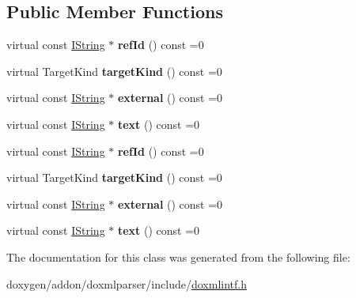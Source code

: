 \subsection*{Public Member Functions}
\begin{DoxyCompactItemize}
\item 
\mbox{\label{class_i_doc_ref_a941caa7f9be9cca367944c6c9ef35c7c}} 
virtual const \mbox{\hyperlink{class_i_string}{I\+String}} $\ast$ {\bfseries ref\+Id} () const =0
\item 
\mbox{\label{class_i_doc_ref_a2e628bb491696542b6397135db0f5359}} 
virtual Target\+Kind {\bfseries target\+Kind} () const =0
\item 
\mbox{\label{class_i_doc_ref_a4589e3ff94336e997ab08f91ee904c53}} 
virtual const \mbox{\hyperlink{class_i_string}{I\+String}} $\ast$ {\bfseries external} () const =0
\item 
\mbox{\label{class_i_doc_ref_af5982e27f656c7ef7fe39e9c2e657c8e}} 
virtual const \mbox{\hyperlink{class_i_string}{I\+String}} $\ast$ {\bfseries text} () const =0
\item 
\mbox{\label{class_i_doc_ref_a941caa7f9be9cca367944c6c9ef35c7c}} 
virtual const \mbox{\hyperlink{class_i_string}{I\+String}} $\ast$ {\bfseries ref\+Id} () const =0
\item 
\mbox{\label{class_i_doc_ref_a2e628bb491696542b6397135db0f5359}} 
virtual Target\+Kind {\bfseries target\+Kind} () const =0
\item 
\mbox{\label{class_i_doc_ref_a4589e3ff94336e997ab08f91ee904c53}} 
virtual const \mbox{\hyperlink{class_i_string}{I\+String}} $\ast$ {\bfseries external} () const =0
\item 
\mbox{\label{class_i_doc_ref_af5982e27f656c7ef7fe39e9c2e657c8e}} 
virtual const \mbox{\hyperlink{class_i_string}{I\+String}} $\ast$ {\bfseries text} () const =0
\end{DoxyCompactItemize}


The documentation for this class was generated from the following file\+:\begin{DoxyCompactItemize}
\item 
doxygen/addon/doxmlparser/include/\mbox{\hyperlink{include_2doxmlintf_8h}{doxmlintf.\+h}}\end{DoxyCompactItemize}
